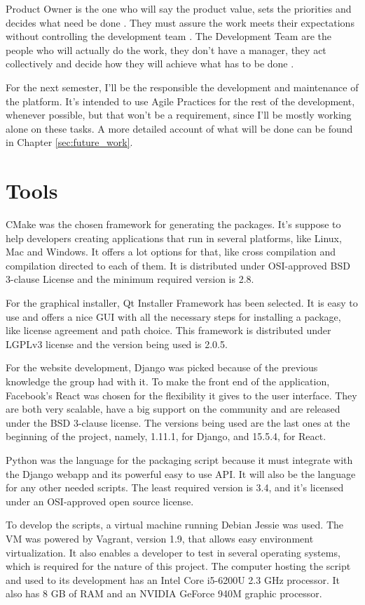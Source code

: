 Product Owner is the one who will say the product value, sets the priorities and decides what need be done \cite{agile422017}. They must assure the work meets their expectations without controlling the development team \cite{scrumalliance2017}. The Development Team are the people who will actually do the work, they don't have a manager, they act collectively and decide how they will achieve what has to be done \cite{scrumalliance2017}.

For the next semester, I'll be the responsible the development and maintenance of the platform. It's intended to use Agile Practices for the rest of the development, whenever possible, but that won't be a requirement, since I'll be mostly working alone on these tasks. A more detailed account of what will be done can be found in Chapter \ref{sec:future_work}.


\section{Tools}
\label{sec:tools}

CMake was the chosen framework for generating the packages. It's suppose to help developers creating applications that run in several platforms, like Linux, Mac and Windows. It offers a lot options for that, like cross compilation and compilation directed to each of them. It is distributed under OSI-approved BSD 3-clause License and the minimum required version is 2.8.

For the graphical installer, Qt Installer Framework has been selected. It is easy to use and offers a nice GUI with all the necessary steps for installing a package, like license agreement and path choice. This framework is distributed under LGPLv3 license and the version being used is 2.0.5.

For the website development, Django was picked because of the previous knowledge the group had with it. To make the front end of the application, Facebook's React was chosen for the flexibility it gives to the user interface. They are both very scalable, have a big support on the community and are released under the BSD 3-clause license. The versions being used are the last ones at the beginning of the project, namely, 1.11.1, for Django, and 15.5.4, for React.

Python was the language for the packaging script because it must integrate with the Django webapp and its powerful easy to use API. It will also be the language for any other needed scripts. The least required version is 3.4, and it's licensed under an OSI-approved open source license.

To develop the scripts, a virtual machine running Debian Jessie was used. The VM was powered by Vagrant, version 1.9, that allows easy environment virtualization. It also enables a developer to test in several operating systems, which is required for the nature of this project. The computer hosting the script and used to its development has an Intel Core i5-6200U 2.3 GHz processor. It also has 8 GB of RAM and an NVIDIA GeForce 940M graphic processor.
